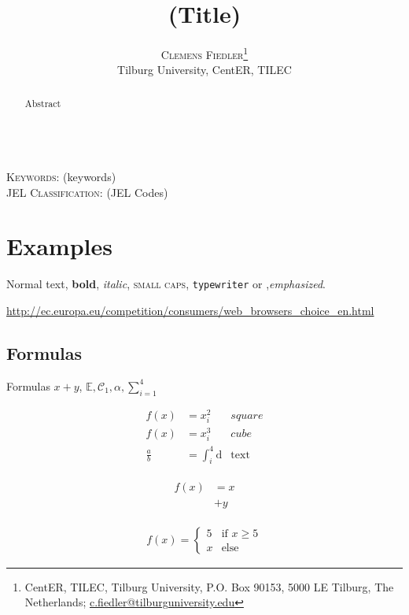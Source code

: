 \documentclass[a4paper, 11pt]{article}
\author{\textsc{Clemens Fiedler}\thanks{CentER, TILEC, Tilburg University, P.O. Box 90153, 5000 LE Tilburg, The Netherlands; \href{mailto:c.fiedler@tilburguniversity.edu}{c.fiedler@tilburguniversity.edu}}\\
	Tilburg University, CentER, TILEC}
\title{(Title)}
\renewcommand{\d}{\text{d}}
\newcommand{\note}[1]{\marginpar{\footnotesize #1} }
\begin{document}
	
\maketitle

\begin{abstract}
	Abstract
\end{abstract}

\hspace{4cm}\\
\noindent\textsc{Keywords:} (keywords)\\
\noindent\textsc{JEL Classification:} (JEL Codes)

\newpage
\tableofcontents

\newpage
\listoffigures

\newpage
\section{Examples}\label{sec:examples}

Normal text, \textbf{bold}, \textit{italic}, \textsc{small caps}, \texttt{typewriter} or ,\emph{emphasized}. \note{side note}

\url{http://ec.europa.eu/competition/consumers/web_browsers_choice_en.html}

\subsection{Formulas}
Formulas $x+y$, $\mathbb{E}, \mathcal{C}_1, \alpha, \sum_{i=1}^{4}$

\begin{align}
f(x)&=x_i^2 &square\\
f(x)&=x_i^3 &cube\\
\frac{a}{b}&=\int_{i}^{4} \d &\text{text}\nonumber
\end{align}

\begin{align}
	\begin{split}
	f(x)&=x\\
	&+y
	\end{split}
\end{align}

\begin{align}
	f(x)=
	\begin{cases}
	5& \text{if } x \geq 5\\
	x& \text{else}
	\end{cases}
\end{align}
\end{document}
